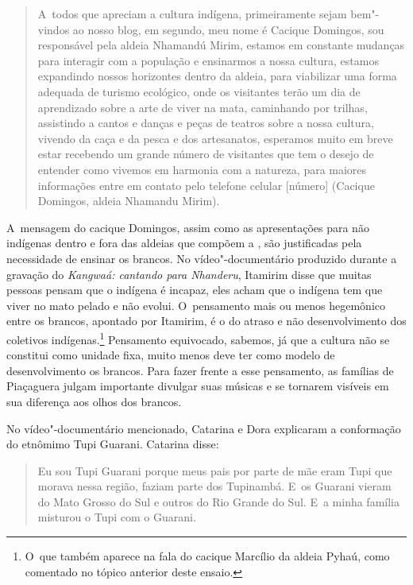 \begin{quote}
\noindent
A~todos que apreciam a cultura indígena, primeiramente sejam bem"-vindos ao
nosso blog, em segundo, meu nome é Cacique Domingos, sou responsável
pela aldeia Nhamandú Mirim, estamos em constante mudanças para
interagir com a população e ensinarmos a nossa cultura, estamos
expandindo nossos horizontes dentro da aldeia, para viabilizar uma
forma adequada de turismo ecológico, onde os visitantes terão um dia de
aprendizado sobre a arte de viver na mata, caminhando por trilhas,
assistindo a cantos e danças e peças de teatros sobre a nossa cultura,
vivendo da caça e da pesca e dos artesanatos, esperamos muito em breve
estar recebendo um grande número de visitantes que tem o desejo de
entender como vivemos em harmonia com a natureza, para maiores
informações entre em contato pelo telefone celular [número] (Cacique
Domingos, aldeia Nhamandu Mirim).
\end{quote}

A~mensagem do cacique Domingos, assim como as apresentações para não
indígenas dentro e fora das aldeias que compõem a , são justificadas
pela necessidade de ensinar os brancos. No vídeo"-documentário produzido
durante a gravação do  \emph{Kangwaá: cantando para Nhanderu}, Itamirim
disse que muitas pessoas pensam que o indígena é incapaz, eles acham
que o indígena tem que viver no mato pelado e não evolui. O~pensamento
mais ou menos hegemônico entre os brancos, apontado por Itamirim, é o
do atraso e não desenvolvimento dos coletivos indígenas.\footnote{O~que
também aparece na fala do cacique Marcílio da aldeia Pyhaú, como
comentado no tópico anterior deste ensaio.} Pensamento equivocado,
sabemos, já que a cultura não se constitui como unidade fixa, muito
menos deve ter como modelo de desenvolvimento os brancos. Para fazer
frente a esse pensamento, as famílias de Piaçaguera julgam importante
divulgar suas músicas e se tornarem visíveis em sua diferença aos olhos
dos brancos.

No vídeo"-documentário mencionado, Catarina e Dora explicaram a
conformação do etnômimo Tupi Guarani. Catarina disse: 

\begin{quote}
\noindent
Eu sou Tupi Guarani porque meus pais por parte de mãe eram Tupi que
morava nessa região, faziam parte dos Tupinambá. E~os Guarani vieram do
Mato Grosso do Sul e outros do Rio Grande do Sul. E~a minha família
misturou o Tupi com o Guarani.
\end{quote}

